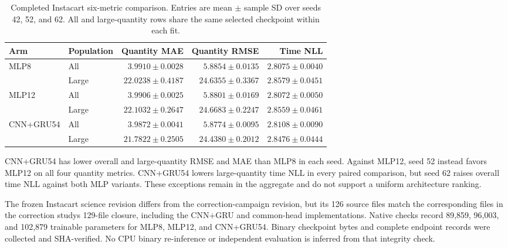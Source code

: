 \documentclass[runningheads]{llncs}
\begin{document}
\begin{table}[htbp]
\caption{Completed Instacart six-metric comparison. Entries are mean $\pm$ sample SD over seeds 42, 52, and 62. All and large-quantity rows share the same selected checkpoint within each fit.}
\label{tab:instacart-six}
\centering\small
\setlength{\tabcolsep}{3pt}
\renewcommand{\arraystretch}{1.12}
\begin{tabular}{@{}llrrr@{}}
\toprule
Arm & Population & Quantity MAE & Quantity RMSE & Time NLL\\
\midrule
MLP8 & All & $3.9910\pm0.0028$ & $5.8854\pm0.0135$ & $2.8075\pm0.0040$\\
 & Large & $22.0238\pm0.4187$ & $24.6355\pm0.3367$ & $2.8579\pm0.0451$\\
\midrule
MLP12 & All & $3.9906\pm0.0025$ & $5.8801\pm0.0169$ & $2.8072\pm0.0050$\\
 & Large & $22.1032\pm0.2647$ & $24.6683\pm0.2247$ & $2.8559\pm0.0461$\\
\midrule
CNN+GRU54 & All & $3.9872\pm0.0041$ & $5.8774\pm0.0095$ & $2.8108\pm0.0090$\\
 & Large & $21.7822\pm0.2505$ & $24.4380\pm0.2012$ & $2.8476\pm0.0444$\\
\bottomrule
\end{tabular}
\end{table}

CNN+GRU54 has lower overall and large-quantity RMSE and MAE than MLP8 in each seed. Against MLP12, seed 52 instead favors MLP12 on all four quantity metrics. CNN+GRU54 lowers large-quantity time NLL in every paired comparison, but seed 62 raises overall time NLL against both MLP variants. These exceptions remain in the aggregate and do not support a uniform architecture ranking.

The frozen Instacart science revision differs from the correction-campaign revision, but its 126 source files match the corresponding files in the correction study\textquotesingle s 129-file closure, including the CNN+GRU and common-head implementations. Native checks record 89,859, 96,003, and 102,879 trainable parameters for MLP8, MLP12, and CNN+GRU54. Binary checkpoint bytes and complete endpoint records were collected and SHA-verified. No CPU binary re-inference or independent evaluation is inferred from that integrity check.
\end{document}
